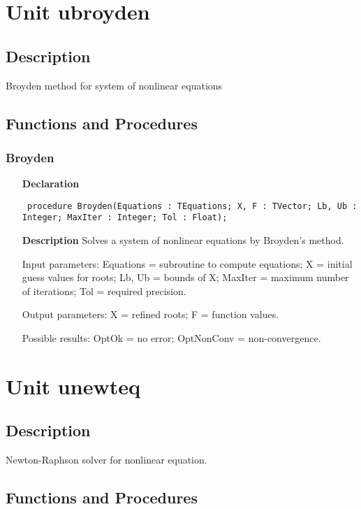 \documentclass[12pt,a4paper,oneside]{report}
\newcommand{\declarationitem}[1]{\textbf{#1}}
\newcommand{\descriptiontitle}[1]{\textbf{#1}}
\newcommand{\code}[1]{\texttt{#1}}
\begin{document}
\section{Unit ubroyden}
\label{ubroyden}
\subsection{Description}
Broyden method for system of nonlinear equations 
\subsection{Functions and Procedures}
\subsubsection{Broyden}
\label{ubroyden-Broyden}
\begin{itemize}\item[\declarationitem{Declaration}\hfill]
	\begin{flushleft}
		\code{
			procedure Broyden(Equations : TEquations; X, F : TVector; Lb, Ub : Integer; MaxIter : Integer; Tol : Float);}
		
	\end{flushleft}
	
	\par
	\item[\descriptiontitle{Description}]
	Solves a system of nonlinear equations by Broyden's method.
	
	Input parameters: Equations = subroutine to compute equations; X = initial guess values for roots; Lb, Ub = bounds of X; MaxIter = maximum number of iterations; Tol = required precision.
	
	Output parameters: X = refined roots; F = function values.
	
	Possible results: OptOk = no error; OptNonConv = non{-}convergence.
\end{itemize}
\section{Unit unewteq}
\label{unewteq}
\subsection{Description}
Newton{-}Raphson solver for nonlinear equation.
\subsection{Functions and Procedures}
\end{document}
